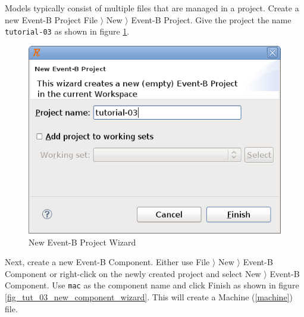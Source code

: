 Models typically consist of multiple files that are managed in a project.  Create a new Event-B Project \textsf{File $\rangle$ New $\rangle$ Event-B Project}.  Give the project the name \texttt{tutorial-03} as shown in figure \ref{fig_tut_03_new_project_wizard}.

\begin{figure}[!h]
\begin{center}
	\includegraphics[]{img/tutorial/tut_03_tutorial-3.png}
	\caption{New Event-B Project Wizard}
	\label{fig_tut_03_new_project_wizard}
\end{center}
\end{figure}


Next, create a new Event-B Component.  Either use \textsf{File $\rangle$ New $\rangle$ Event-B Component} or right-click on the newly created project and select \textsf{New $\rangle$ Event-B Component}.  Use \texttt{mac} as the component name and click \textsf{Finish} as shown in figure \ref{fig_tut_03_new_component_wizard}. This will create a Machine (\ref{machine}) file.


